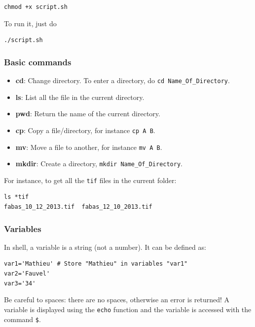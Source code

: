 \documentclass[a4paper,11pt,DIV=18]{scrartcl}
\begin{document}
\begin{verbatim}
chmod +x script.sh
\end{verbatim}
To run it, just do

\begin{verbatim}
./script.sh
\end{verbatim}

\subsubsection{Basic commands}
\label{sec:org58bf498}
\begin{itemize}
\item \textbf{cd}: Change directory. To enter a directory, do \texttt{cd Name\_Of\_Directory}.
\item \textbf{ls}: List all the file in the current directory.
\item \textbf{pwd}: Return the name of the current directory.
\item \textbf{cp}: Copy a file/directory, for instance \texttt{cp A B}.
\item \textbf{mv}: Move a file to another, for instance \texttt{mv A B}.
\item \textbf{mkdir}: Create a directory, \texttt{mkdir Name\_Of\_Directory}.
\end{itemize}

For instance, to get all the \texttt{tif} files in the current folder:

\begin{verbatim}
ls *tif
fabas_10_12_2013.tif  fabas_12_10_2013.tif
\end{verbatim}

\subsubsection{Variables}
\label{sec:orgb3ee8bc}
In shell, a variable is a string (not a number). It can be defined as:

\begin{verbatim}
var1='Mathieu' # Store "Mathieu" in variables "var1"
var2='Fauvel'
var3='34'
\end{verbatim}

Be  careful to  spaces: there  are no  spaces, otherwise  an error  is
returned!  A  variable is  displayed using the  \texttt{echo} function  and the
variable is accessed with the command \texttt{\$}.
\end{document}
